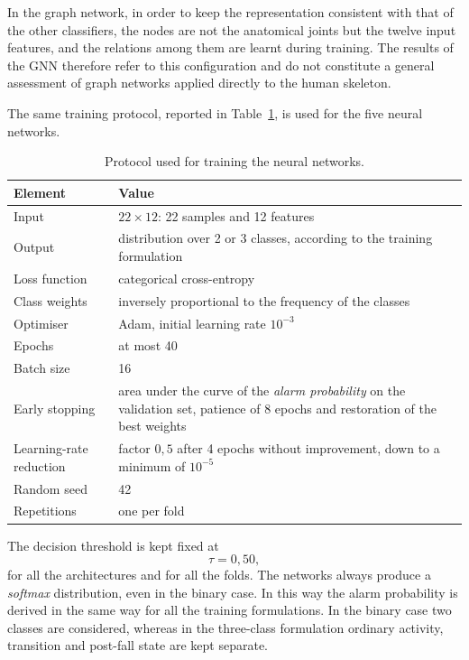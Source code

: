 In the graph network, in order to keep the representation consistent with that of the other classifiers, the nodes are not the anatomical joints but the twelve input features, and the relations among them are learnt during training. The results of the GNN therefore refer to this configuration and do not constitute a general assessment of graph networks applied directly to the human skeleton.

The same training protocol, reported in Table~\ref{tab:addestramento}, is used for the five neural networks.

\begin{table}[htbp]
\centering
\caption{Protocol used for training the neural networks.}
\label{tab:addestramento}
\begin{tabular}{@{}p{4.6cm}p{9.0cm}@{}}
\toprule
\textbf{Element} & \textbf{Value} \\
\midrule
Input & \(22\times12\): 22 samples and 12 features \\
Output & distribution over 2 or 3 classes, according to the training formulation \\
Loss function & categorical cross-entropy \\
Class weights & inversely proportional to the frequency of the classes \\
Optimiser & Adam, initial learning rate \(10^{-3}\) \\
Epochs & at most 40 \\
Batch size & 16 \\
Early stopping & area under the curve of the \emph{alarm probability} on the validation set, patience of 8 epochs and restoration of the best weights \\
Learning-rate reduction & factor \(0{,}5\) after 4 epochs without improvement, down to a minimum of \(10^{-5}\) \\
Random seed & 42 \\
Repetitions & one per fold \\
\bottomrule
\end{tabular}
\end{table}

The decision threshold is kept fixed at
\[
\tau = 0{,}50,
\]
for all the architectures and for all the folds. The networks always produce a \emph{softmax} distribution, even in the binary case. In this way the alarm probability is derived in the same way for all the training formulations. In the binary case two classes are considered, whereas in the three-class formulation ordinary activity, transition and post-fall state are kept separate.


